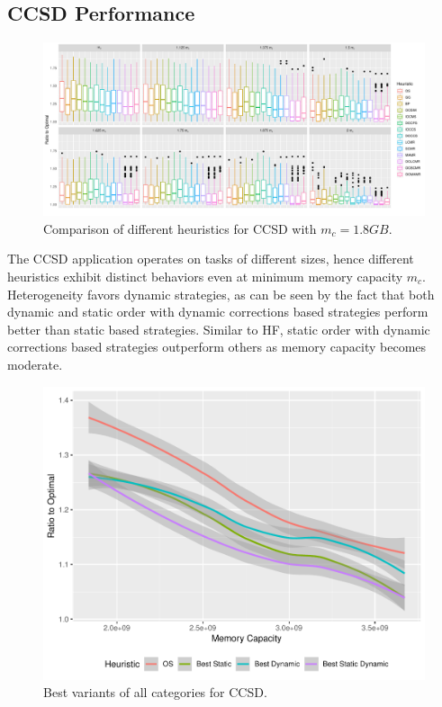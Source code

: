 \documentclass[sigconf]{acmart}
\begin{document}
{		%
		
		\subsection{CCSD Performance}
		\begin{figure}[htb]
			\includegraphics[scale=0.5]{./results/ratio_to_optimal_selected_ccsd.pdf}
			\caption{Comparison of different heuristics for CCSD with $m_c=1.8GB$.}
			\label{fig:ratio_to_optimal_ccsd}
		\end{figure}	
		
		The CCSD application operates on tasks of different sizes, hence different heuristics exhibit distinct behaviors even at minimum memory capacity $m_c$. Heterogeneity favors dynamic strategies, as can be seen by the fact that both dynamic and static order with dynamic corrections based strategies perform better than static based strategies. Similar to HF, static order with dynamic corrections based strategies outperform others as memory capacity becomes moderate. 
		
		
		\begin{figure}[htb]
			\includegraphics[scale=0.5]{./results/ratio_to_optimal_ccsd-best.pdf}
			\caption{Best variants of all categories for CCSD.}
			\label{fig:ratio_to_optimal_best_ccsd}
		\end{figure}
		
}
\end{document}
